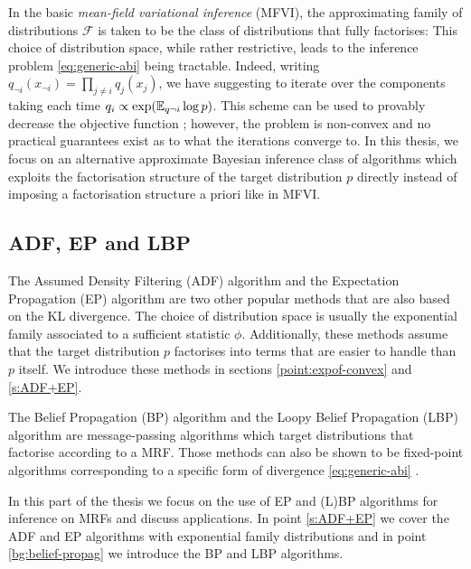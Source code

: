 In the basic \emph{mean-field variational inference} (MFVI), the approximating family of distributions $\mathcal F$ is taken to be the class of distributions that fully factorises:
%
% 
This choice of distribution space, while rather restrictive, leads to the inference problem \eqref{eq:generic-abi} being tractable. Indeed, writing $q_{\neg i}(x_{\neg i}) = \prod_{j\neq i} q_{j}(x_{j}) $, we have
suggesting to iterate over the components taking each time $q_{i} \propto \exp(\mathbb E_{q\neg i} \log p) $. This scheme can be used to provably decrease the objective function \citep{hoffman13, kucukelbir16, blei16}; however, the problem is non-convex and no practical guarantees exist as to what the iterations converge to. 
In this thesis, we focus on an alternative approximate Bayesian inference class of algorithms which exploits the factorisation structure of the target distribution $p$ directly instead of imposing a factorisation structure a priori like in MFVI.

\subsection{ADF, EP and LBP}
The Assumed Density Filtering (ADF) algorithm and the  Expectation Propagation (EP) algorithm are two other popular methods that are also based on the KL divergence. The choice of distribution space is usually the exponential family associated to a sufficient statistic $\phi$. Additionally, these methods assume that the target distribution $p$ factorises into terms that are easier to handle than $p$ itself. We introduce these methods in sections \ref{point:expof-convex} and \ref{s:ADF+EP}.

The Belief Propagation (BP) algorithm and the Loopy Belief Propagation (LBP) algorithm are message-passing algorithms which target distributions that factorise according to a MRF. Those methods can also be shown to be fixed-point algorithms corresponding to a specific form of divergence \eqref{eq:generic-abi} \citep{yedidia01, yedidia02}.

In this part of the thesis we focus on the use of EP and (L)BP algorithms for inference on MRFs and discuss applications. In point \ref{s:ADF+EP} we cover the ADF and EP algorithms with exponential family distributions and in point \ref{bg:belief-propag} we introduce the BP and LBP algorithms.




